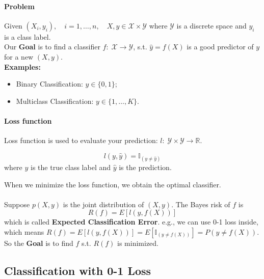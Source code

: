 \documentclass[12pt]{book}
\theoremstyle{definition}
\theoremstyle{remark}
\newcommand{\R}{\mathbb{R}}
\begin{document}
\paragraph{Problem}
Given $(X_i, y_i),\quad i = 1,\dots,n, \quad X,y \in \mathcal{X}\times \mathcal{Y}$ where $\mathcal{Y}$ is a discrete space and $y_i$ is a class label.\\
Our \textbf{Goal} is to find a classifier $f: \; \mathcal{X} \rightarrow \mathcal{Y}$, s.t. $\hat{y} = f(X)$ is a good predictor of $y$ for a new $(X, y)$.\\

\textbf{Examples:}
\begin{itemize}
    \item Binary Classification: $y \in \{0,1\}$;
    \item Multiclass Classification: $y \in \{1,\dots, K\}$.
\end{itemize}

\paragraph{Loss function}
Loss function is used to evaluate your prediction: $l :\; \mathcal{Y}\times \mathcal{Y} \rightarrow \R$. \\

\begin{notionbox}
\[l(y,\hat{y}) = \mathbb{I}_{(y\ne \hat{y})}\]
where $y$ is the true class label and $\hat{y}$ is the prediction. 
\end{notionbox}

When we minimize the loss function, we obtain the optimal classifier. \\
\\
Suppose $p(X,y)$ is the joint distribution of $(X,y)$. The Bayes risk of $f$ is \[R(f) = E[l(y,f(X))]\] which is called \textbf{Expected Classification Error}. e.g., we can use 0-1 loss inside, which means $R(f) = E[l(y,f(X))] = E[\mathbb{I}_{(y \ne f(X))}] = P(y \ne f(X))$. So the \textbf{Goal} is to find $f$ s.t. $R(f)$ is minimized. \\

\subsection{Classification with 0-1 Loss}
\end{document}
